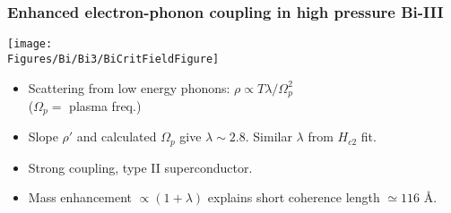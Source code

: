 \begin{frame}[label=BiSuper2]
  \frametitle{Enhanced electron-phonon coupling in high pressure Bi-III}
  
  \centerline{\texttt{[image: \\Figures/Bi/Bi3/BiCritFieldFigure]}}
  
  \begin{itemize}
  \item Scattering from low energy phonons:
  $\rho \propto T \lambda/\Omega_p^2$\\
  ($\Omega_p = $ plasma freq.)
  
  \item Slope $\rho'$ and calculated $\Omega_p$ give
    $\lambda\sim 2.8$. Similar $\lambda$ from $H_{c2}$ fit.
  \item Strong coupling, type II superconductor. 
  \item Mass enhancement $\propto (1+\lambda)$
    explains short coherence length $\simeq 116$ \AA.
  \end{itemize}
  \end{frame}

